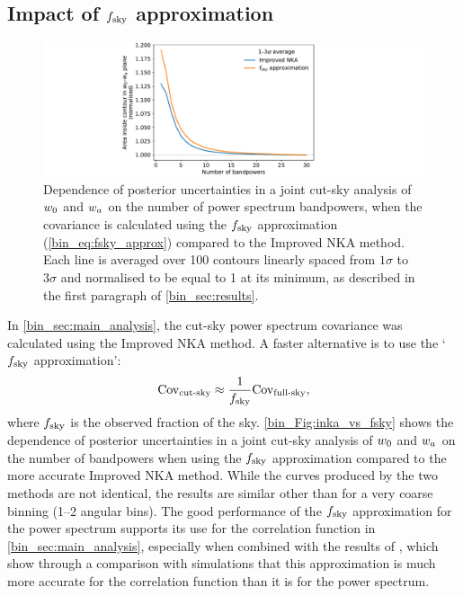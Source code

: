 \subsection{Impact of \texorpdfstring{$f_\text{sky}$}{fsky} approximation}
\label{bin_sec:fsky}

\begin{figure}[t]
\includegraphics[width=\textwidth]{inka_vs_fsky}
\caption{Dependence of posterior uncertainties in a joint cut-sky analysis of $w_0$ and $w_a$ on the number of power spectrum bandpowers, when the covariance is calculated using the $f_\text{sky}$ approximation (\autoref{bin_eq:fsky_approx}) compared to the Improved NKA method. Each line is averaged over 100 contours linearly spaced from $1\sigma$ to $3\sigma$ and normalised to be equal to 1 at its minimum, as described in the first paragraph of \autoref{bin_sec:results}.}
\label{bin_Fig:inka_vs_fsky}
\end{figure}

In \autoref{bin_sec:main_analysis}, the cut-sky power spectrum covariance was calculated using the Improved NKA method. A faster alternative is to use the `$f_\text{sky}$ approximation':
\begin{equation}
\text{Cov}_\text{cut-sky} \approx \frac{1}{f_\text{sky}}
\text{Cov}_\text{full-sky},
\label{bin_eq:fsky_approx}
\end{equation}
where $f_\text{sky}$ is the observed fraction of the sky. \autoref{bin_Fig:inka_vs_fsky} shows the dependence of posterior uncertainties in a joint cut-sky analysis of $w_0$ and $w_a$ on the number of bandpowers when using the $f_\text{sky}$ approximation compared to the more accurate Improved NKA method.
While the curves produced by the two methods are not identical, the results are similar other than for a very coarse binning (1--2 angular bins).
The good performance of the $f_\text{sky}$ approximation for the power spectrum supports its use for the correlation function in \autoref{bin_sec:main_analysis}, especially when combined with the results of \citet{Cabre2007}, which show through a comparison with simulations that this approximation is much more accurate for the correlation function than it is for the power spectrum.

